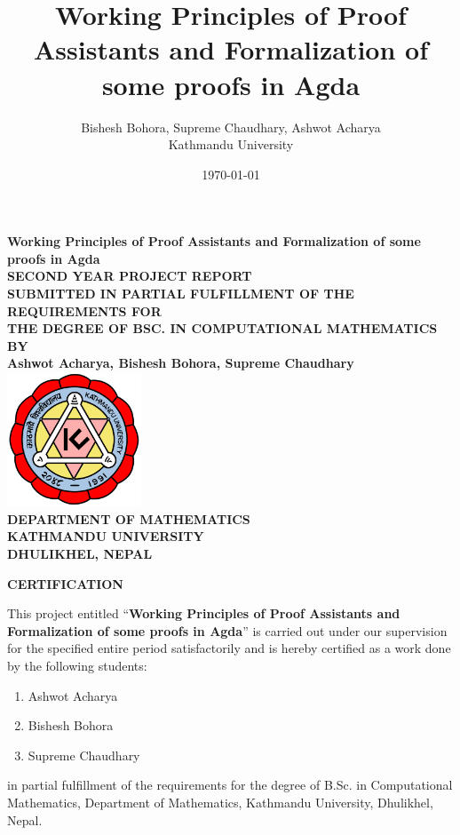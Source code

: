 \documentclass[12pt]{article}
\title{Working Principles of Proof Assistants and Formalization of some proofs in Agda}
\author{Bishesh Bohora, Supreme Chaudhary, Ashwot Acharya \\
\small Kathmandu University 
\small \texttt{}
}
\date{\today}
\begin{document}
\begin{titlepage}
    \begin{center}
        \Large\bfseries
        Working Principles of Proof Assistants and Formalization of some proofs in Agda\\[2cm]
        
        \normalsize
        SECOND YEAR PROJECT REPORT\\[2ex]
        
        \small
        SUBMITTED IN PARTIAL FULFILLMENT OF THE REQUIREMENTS FOR\\
        THE DEGREE OF BSC. IN COMPUTATIONAL MATHEMATICS\\[2cm]
        
        \normalsize
        BY\\[2ex]
        \textbf{Ashwot Acharya, Bishesh Bohora, Supreme Chaudhary}\\[2cm]
        
        \includegraphics[width=4cm]{logo.png}\\[2cm]
        
        DEPARTMENT OF MATHEMATICS\\
        KATHMANDU UNIVERSITY\\
        DHULIKHEL, NEPAL\\[2ex]
                
        \vfill
    \end{center}
\end{titlepage}

\thispagestyle{empty}

\begin{center}
    \textbf{\LARGE CERTIFICATION}
\end{center}

\vspace{1em}

This project entitled ``\textbf{Working Principles of Proof Assistants and Formalization of some proofs in Agda}'' is carried out under our supervision for the specified entire period satisfactorily and is hereby certified as a work done by the following students:
\begin{enumerate}
    \item Ashwot Acharya
    \item Bishesh Bohora 
    \item Supreme Chaudhary
\end{enumerate}
in partial fulfillment of the requirements for the degree of B.Sc. in Computational Mathematics, Department of Mathematics, Kathmandu University, Dhulikhel, Nepal.
\end{document}
